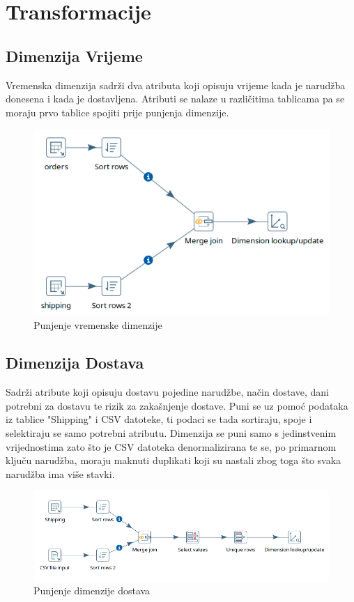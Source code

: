 \documentclass[12pt, oneside]{book}
\begin{document}
\vspace{8cm}

\section{Transformacije}


\subsection{Dimenzija Vrijeme}
Vremenska dimenzija sadrži dva atributa koji opisuju vrijeme kada je narudžba donesena i kada je dostavljena. Atributi se nalaze u različitima tablicama pa se moraju prvo tablice spojiti prije punjenja dimenzije.

\begin{figure}[H]
\includegraphics[width=16cm]{images/i05_Pentaho-Dim-Time.png}
\centering
\caption{Punjenje vremenske dimenzije}
\end{figure}
\subsection{Dimenzija Dostava}
Sadrži atribute koji opisuju dostavu pojedine narudžbe, način dostave, dani potrebni za dostavu te rizik za zakašnjenje dostave. Puni se uz pomoć podataka iz tablice "Shipping" i CSV datoteke, ti podaci se tada sortiraju, spoje i selektiraju se samo potrebni atributu. Dimenzija se puni samo s jedinstvenim vrijednostima zato što je CSV datoteka denormalizirana te se, po primarnom ključu narudžba, moraju maknuti duplikati koji su nastali zbog toga što svaka narudžba ima više stavki. 
\begin{figure}[H]
\includegraphics[width=16cm]{images/i04_Pentaho-Dim-Shipping.png}
\centering
\caption{Punjenje dimenzije dostava}
\end{figure}
\end{document}
